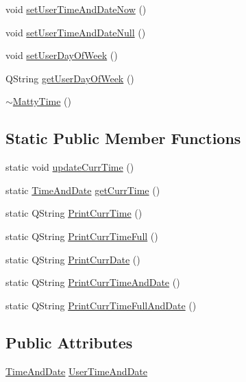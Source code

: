 \begin{DoxyCompactItemize}
\item 
void \hyperlink{classMattyTime_afef585f71d11eed7777065af8ca0e9f0}{set\+User\+Time\+And\+Date\+Now} ()
\item 
void \hyperlink{classMattyTime_a6ae52c957bcf12e92624e09db890ce21}{set\+User\+Time\+And\+Date\+Null} ()
\item 
void \hyperlink{classMattyTime_a12b0e0b9c4d45248da89e2d4078d4d08}{set\+User\+Day\+Of\+Week} ()
\item 
Q\+String \hyperlink{classMattyTime_ad2f12ac7d1a959ee9e19a4eac30484fd}{get\+User\+Day\+Of\+Week} ()
\item 
\hyperlink{classMattyTime_acb302c8f6c5215dc974f87753ed2fd61}{$\sim$\+Matty\+Time} ()
\end{DoxyCompactItemize}
\subsection*{Static Public Member Functions}
\begin{DoxyCompactItemize}
\item 
static void \hyperlink{classMattyTime_a52a7500e419fe56d10ddf2715fc96d06}{update\+Curr\+Time} ()
\item 
static \hyperlink{structTimeAndDate}{Time\+And\+Date} \hyperlink{classMattyTime_a64fff9c9a7da58881a4c0cc1a2ac84f7}{get\+Curr\+Time} ()
\item 
static Q\+String \hyperlink{classMattyTime_ac5ecfd2ff5329b3476906b39bbf02ae3}{Print\+Curr\+Time} ()
\item 
static Q\+String \hyperlink{classMattyTime_a9d3500ad88197ee8e2db9f36aec1a266}{Print\+Curr\+Time\+Full} ()
\item 
static Q\+String \hyperlink{classMattyTime_af87198affde58c9f254dbf1601fb9f1e}{Print\+Curr\+Date} ()
\item 
static Q\+String \hyperlink{classMattyTime_a96805256f90a469aa22824a1e2dd219d}{Print\+Curr\+Time\+And\+Date} ()
\item 
static Q\+String \hyperlink{classMattyTime_a82a6b06fa496b4d0f9b8d6e11d5b03c8}{Print\+Curr\+Time\+Full\+And\+Date} ()
\end{DoxyCompactItemize}
\subsection*{Public Attributes}
\begin{DoxyCompactItemize}
\item 
\hyperlink{structTimeAndDate}{Time\+And\+Date} \hyperlink{classMattyTime_a7a1ceab576011e56405b49d7bd81e475}{User\+Time\+And\+Date}
\end{DoxyCompactItemize}
